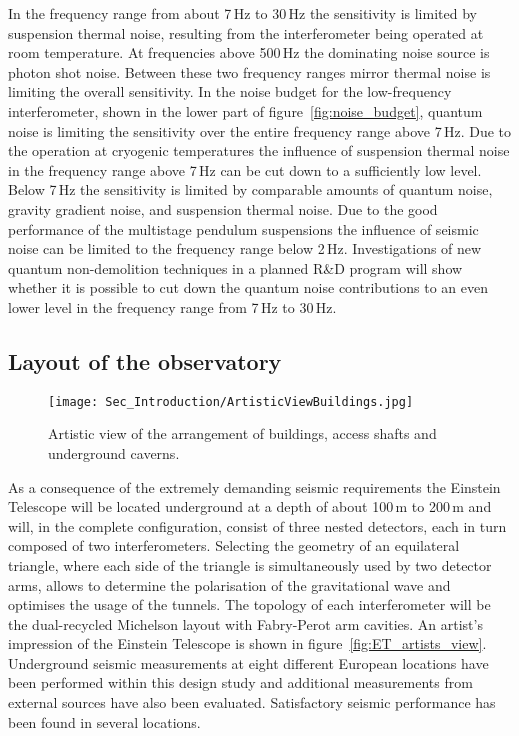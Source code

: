 In the frequency range from about 7\,Hz to 30\,Hz the sensitivity is limited by
suspension thermal noise, resulting from the interferometer being operated 
at room temperature. At frequencies above 500\,Hz the dominating noise 
source is photon shot noise. Between these two frequency ranges mirror 
thermal noise is limiting the overall sensitivity. In the noise budget for the 
low-frequency interferometer, shown in the lower part of 
figure~\ref{fig:noise_budget}, quantum noise is limiting the sensitivity over 
the entire frequency range above 7\,Hz. Due to the operation at cryogenic 
temperatures the influence of suspension thermal noise in the frequency 
range above 7\,Hz can be cut down to a sufficiently low level. Below 7\,Hz 
the sensitivity is limited by comparable amounts of quantum noise, 
gravity gradient noise, and suspension thermal noise. Due to the good 
performance of the multistage pendulum suspensions the influence of 
seismic noise can be limited to the frequency range below 2\,Hz. Investigations 
of new quantum non-demolition techniques in a planned R\&D program will 
show whether it is possible to cut down the quantum noise contributions to 
an even lower level in the frequency range from 7\,Hz to 30\,Hz.

\FloatBarrier
\clearpage
\subsection{Layout of the observatory}

\begin{wrapfigure}{r}{0.6\textwidth}
\centering
\vskip -0.35cm
\texttt{[image: Sec\_Introduction/ArtisticViewBuildings.jpg]}
\vskip 0.3cm
\caption{Artistic view of the arrangement of buildings, access shafts and underground caverns.}
\vskip -0.1cm
\label{Fig:Buildings}
\end{wrapfigure} 

As a consequence of the extremely demanding seismic requirements the Einstein 
Telescope will be located underground at a depth of about 100\,m to 200\,m and 
will, in the complete configuration, consist of three nested detectors, each in turn 
composed of two interferometers. Selecting the geometry of an equilateral triangle, 
where each side of the triangle is simultaneously used by two detector arms, allows 
to determine the polarisation of the gravitational wave and optimises the usage of 
the tunnels. The topology of each interferometer will be the dual-recycled Michelson 
layout with Fabry-Perot arm cavities. An artist's impression of the Einstein Telescope 
is shown in figure~\ref{fig:ET_artists_view}. \\
Underground seismic measurements at eight different European locations have 
been performed within this design study and additional measurements from 
external sources have also been evaluated. Satisfactory seismic performance has 
been found in several locations. 

